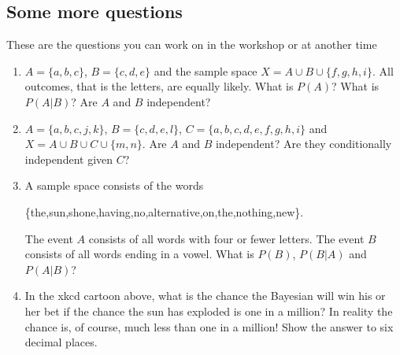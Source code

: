 \documentclass[11pt,a4paper]{scrartcl}
\begin{document}
\subsection*{Some more questions}

These are the questions you can work on in the workshop or at another time

\begin{enumerate}

\item $A=\{a,b,c\}$, $B=\{c,d,e\}$ and the sample space $X=A\cup B\cup \{f,g,h,i\}$. All outcomes, that is the letters, are equally likely. What is $P(A)$? What is $P(A|B)$? Are $A$ and $B$ independent?

\item $A=\{a,b,c,j,k\}$, $B=\{c,d,e,l\}$, $C=\{a,b,c,d,e,f,g,h,i\}$ and $X=A\cup B\cup C\cup \{m,n\}$. Are $A$ and $B$ independent? Are they conditionally independent given $C$?

\item A sample space consists of the words
\begin{center}
  \{the,sun,shone,having,no,alternative,on,the,nothing,new\}.
  \end{center}
The event $A$ consists of all words with four or fewer letters. The event $B$ consists of all words ending in a vowel. What is $P(B)$, $P(B|A)$ and $P(A|B)$?


\item In the xkcd cartoon above, what is the chance the Bayesian will
  win his or her bet if the chance the sun has exploded is one in a
  million? In reality the chance is, of course, much less than one in
  a million! Show the answer to six decimal places.
  
\end{enumerate}
\end{document}
